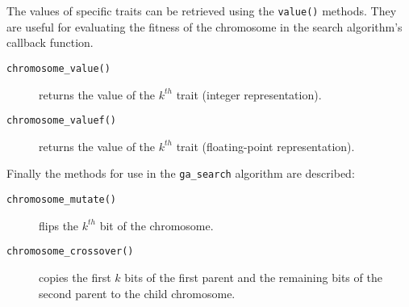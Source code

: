 %
The values of specific traits can be retrieved using the {\tt value()}
methods.
They are useful for evaluating the fitness of the chromosome in the
search algorithm's callback function.
%
\begin{description}
\item[{\tt chromosome\_value()}]
    returns the value of the $k^{th}$ trait (integer representation).
\item[{\tt chromosome\_valuef()}]
    returns the value of the $k^{th}$ trait (floating-point representation).
\end{description}
%
Finally the methods for use in the {\tt ga\_search} algorithm are
described:
%
\begin{description}
\item[{\tt chromosome\_mutate()}]
    flips the $k^{th}$ bit of the chromosome.
\item[{\tt chromosome\_crossover()}]
    copies the first $k$ bits of the first parent and the remaining bits
    of the second parent to the child chromosome.
\end{description}
%

